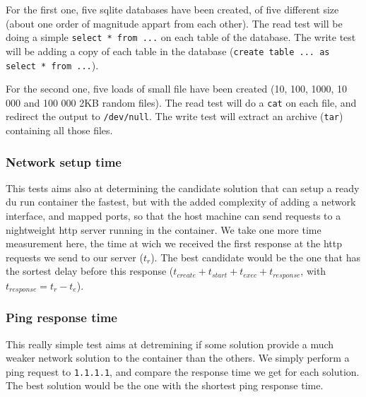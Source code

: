 For the first one, five sqlite databases have been created, of five different size (about one order of magnitude appart from each other).  The read test will be doing a simple \texttt{select * from ...} on each table of the database.  The write test will be adding a copy of each table in the database (\texttt{create table ... as select * from ...}).

For the second one, five loads of small file have been created (10, 100, 1000, 10 000 and 100 000 2KB random files).  The read test will do a \texttt{cat} on each file, and redirect the output to \texttt{/dev/null}.  The write test will extract an archive (\texttt{tar}) containing all those files.

\subsubsection{Network setup time}
This tests aims also at determining the candidate solution that can setup a ready du run container the fastest, but with the added complexity of adding a network interface, and mapped ports, so that the host machine can send requests to a nightweight http server running in the container.  We take one more time measurement here, the time at wich we received the first response at the http requests we send to our server ($t_r$).  The best candidate would be the one that has the sortest delay before this response ($t_{create} + t_{start} + t_{exec} + t_{response}$, with $t_{response}=t_r - t_e$).

\subsubsection{Ping response time}
This really simple test aims at detremining if some solution provide a much weaker network solution to the container than the others.  We simply perform a ping request to \texttt{1.1.1.1}, and compare the response time we get for each solution.  The best solution would be the one with the shortest ping response time.
